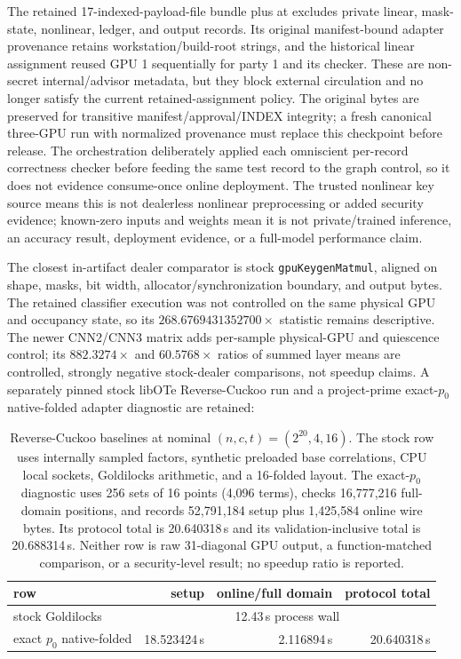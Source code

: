 \documentclass[11pt]{article}
\begin{document}
The retained 17-indexed-payload-file bundle plus  at
 excludes private
linear, mask-state, nonlinear, ledger, and output records. Its original
manifest-bound adapter provenance retains workstation/build-root strings, and
the historical linear assignment reused GPU 1 sequentially for party 1 and its
checker. These are non-secret internal/advisor metadata, but they block external
circulation and no longer satisfy the current retained-assignment policy. The
original bytes are preserved for transitive manifest/approval/INDEX integrity;
a fresh canonical three-GPU run with normalized provenance must replace this
checkpoint before release. The orchestration deliberately applied each
omniscient per-record correctness checker before feeding the same test record
to the graph control, so it does not evidence consume-once online deployment.
The trusted nonlinear key source means this is not dealerless nonlinear
preprocessing or added security evidence; known-zero inputs and weights mean it
is not private/trained inference, an accuracy result, deployment evidence, or a
full-model performance claim.

The closest in-artifact dealer comparator is stock
\texttt{gpuKeygenMatmul}, aligned on shape, masks, bit width,
allocator/synchronization boundary, and output bytes. The retained classifier
execution was not controlled on the same physical GPU and occupancy state, so
its $268.6769431352700\times$ statistic remains descriptive. The newer
CNN2/CNN3 matrix adds per-sample physical-GPU and quiescence control; its
$882.3274\times$ and $60.5768\times$ ratios of summed layer means are
controlled, strongly negative stock-dealer comparisons, not speedup claims.
A separately pinned stock libOTe Reverse-Cuckoo run and a project-prime
exact-$p_0$ native-folded adapter diagnostic are retained:
\begin{table}[ht]
\centering
\small
\begin{tabular}{@{}l r r r@{}}
\toprule
row & setup & online/full domain & protocol total\\
\midrule
stock Goldilocks & \multicolumn{3}{c}{12.43\,s process wall}\\
exact $p_0$ native-folded & 18.523424\,s & 2.116894\,s & 20.640318\,s\\
\bottomrule
\end{tabular}
\caption{Reverse-Cuckoo baselines at nominal $(n,c,t)=(2^{20},4,16)$.
The stock row uses internally sampled factors, synthetic preloaded base
correlations, CPU local sockets, Goldilocks arithmetic, and a 16-folded layout.
The exact-$p_0$ diagnostic uses 256 sets of 16 points (4,096 terms), checks
16,777,216 full-domain positions, and records 52,791,184 setup plus 1,425,584
online wire bytes. Its protocol total is 20.640318\,s and its
validation-inclusive total is 20.688314\,s.
Neither row is raw 31-diagonal GPU output, a function-matched
comparison, or a security-level result; no speedup ratio is reported.}
\label{tab:reverse-cuckoo}
\end{table}
\end{document}
